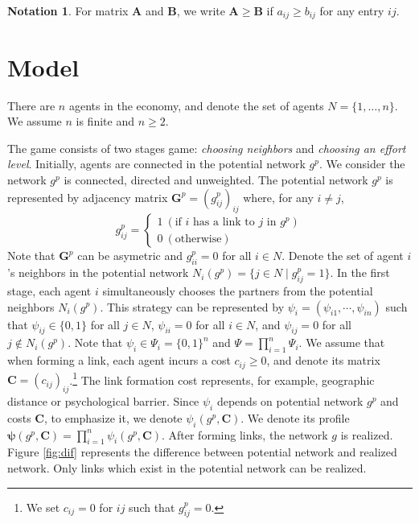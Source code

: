 \documentclass[12pt]{article}
\theoremstyle{definition}
\newtheorem*{notation*}{Notation}
\newcommand{\bm}[1]{\boldsymbol{#1}}
\begin{document}
\begin{notation*}
For matrix $\bm{A}$ and $\bm{B}$, we write $\bm{A} \ge \bm{B}$ if $a_{ij} \ge b_{ij}$ for any entry $ij$.
\end{notation*}

\section{Model}

There are $n$ agents in the economy, and denote the set of agents $N = \{ 1, \ldots, n\}$.
We assume $n$ is finite and $n \ge 2$.

The game consists of two stages game: {\it{choosing neighbors}} and {\it{choosing an effort level}}.
Initially, agents are connected in the potential network $g^p$.
We consider the network $g^p$ is connected, directed and unweighted.
The potential network $g^p$ is represented by adjacency matrix $\bm{G}^p = {(g_{ij}^p)}_{ij}$ where, for any $i \neq j$,
\[ g_{ij}^p =
	\begin{cases}
		1 \  (\text{if $i$ has a link to $j$ in $g^p $}) \\
		0 \  (\text{otherwise})
	\end{cases} \]
Note that $\bm{G}^p$ can be asymetric and $g_{ii}^p = 0$ for all $i \in N$.
Denote the set of agent $i$'s neighbors in the potential network $N_i(g^p) = \{ j \in N \mid g_{ij}^p = 1 \}$.
In the first stage, each agent $i$ simultaneously chooses the partners from the potential neighbors $N_i(g^p)$.
This strategy can be represented by $\psi_i = (\psi_{i1}, \cdots, \psi_{in})$ such that $\psi_{ij} \in \{0, 1\}$ for all $j \in N$, $\psi_{ii}=0$ for all $i \in N$, and $\psi_{ij} = 0$ for all $j \notin N_i(g^p)$.
Note that $\psi_i \in \Psi_i = \{0, 1\}^{n}$ and $\Psi = \prod_{i=1}^n \Psi_i$.
We assume that when forming a link, each agent incurs a cost $c_{ij} \ge 0$, and denote its matrix $\bm{C} = {(c_{ij})}_{ij}$.\footnote{We set $c_{ij} = 0$ for $ij$ such that $g_{ij}^p = 0$.}
The link formation cost represents, for example, geographic distance or psychological barrier.
Since $\psi_i$ depends on potential network $g^p$ and costs $\bm{C}$, to emphasize it, we denote $\psi_i(g^p, \bm{C})$.
We denote its profile $\bm{\psi}(g^p, \bm{C}) = \prod_{i=1}^n \psi_i(g^p, \bm{C})$.
After forming links, the network $g$ is realized.
Figure \ref{fig:dif} represents the difference between potential network and realized network.
Only links which exist in the potential network can be realized.
\end{document}
